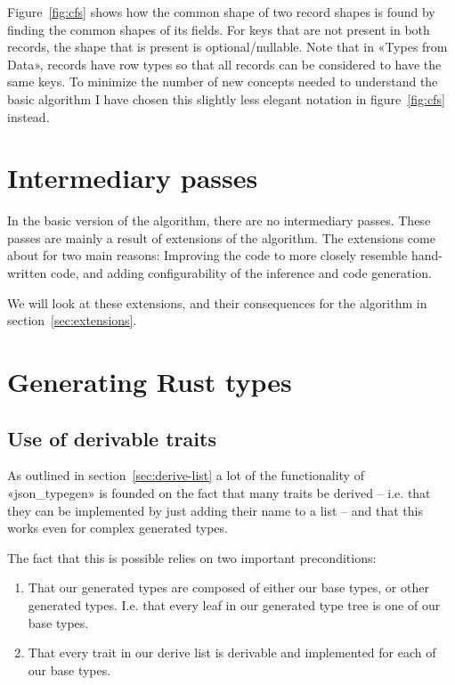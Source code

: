 Figure~\ref{fig:cfs} shows how the common shape of two record shapes is found by finding the common shapes of its fields. For keys that are not present in both records, the shape that is present is optional/nullable. Note that in «Types from Data», records have row types\cite{row-types} so that all records can be considered to have the same keys. To minimize the number of new concepts needed to understand the basic algorithm I have chosen this slightly less elegant notation in figure~\ref{fig:cfs} instead.

\section{Intermediary passes}

In the basic version of the algorithm, there are no intermediary passes. These passes are mainly a result of extensions of the algorithm. The extensions come about for two main reasons: Improving the code to more closely resemble hand-written code, and adding configurability of the inference and code generation.

We will look at these extensions, and their consequences for the algorithm in section~\ref{sec:extensions}.

\section{Generating Rust types}



\subsection{Use of derivable traits}

As outlined in section~\ref{sec:derive-list} a lot of the functionality of «json_typegen» is founded on the fact that many traits be derived -- i.e. that they can be implemented by just adding their name to a list -- and that this works even for complex generated types.

The fact that this is possible relies on two important preconditions:

\begin{enumerate}
  \item That our generated types are composed of either our base types, or other generated types. I.e. that every leaf in our generated type tree is one of our base types.
  \item That every trait in our derive list is derivable and implemented for each of our base types.
\end{enumerate}

